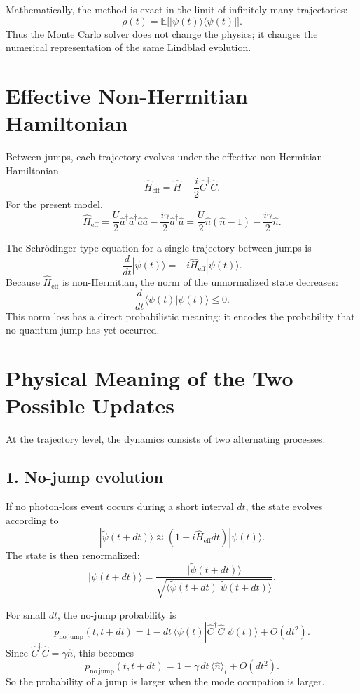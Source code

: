 \documentclass[12pt]{article}
\begin{document}
Mathematically, the method is exact in the limit of infinitely many trajectories:
\[
\rho(t) = \mathbb{E}\bigl[|\psi(t)\rangle\langle\psi(t)|\bigr].
\]
Thus the Monte Carlo solver does not change the physics; it changes the numerical representation of the same Lindblad evolution.

\section*{Effective Non-Hermitian Hamiltonian}
Between jumps, each trajectory evolves under the effective non-Hermitian Hamiltonian
\[
\hat H_{\mathrm{eff}}
= \hat H - \frac{i}{2}\hat C^\dagger \hat C.
\]
For the present model,
\[
\hat H_{\mathrm{eff}}
= \frac{U}{2}\hat a^\dagger \hat a^\dagger \hat a \hat a
- \frac{i\gamma}{2}\hat a^\dagger \hat a
= \frac{U}{2}\hat n(\hat n-1) - \frac{i\gamma}{2}\hat n.
\]

The Schr\"odinger-type equation for a single trajectory between jumps is
\[
\frac{d}{dt}|\psi(t)\rangle
= -i\hat H_{\mathrm{eff}}|\psi(t)\rangle.
\]
Because $\hat H_{\mathrm{eff}}$ is non-Hermitian, the norm of the unnormalized state decreases:
\[
\frac{d}{dt}\langle \psi(t)|\psi(t)\rangle \le 0.
\]
This norm loss has a direct probabilistic meaning: it encodes the probability that no quantum jump has yet occurred.

\section*{Physical Meaning of the Two Possible Updates}
At the trajectory level, the dynamics consists of two alternating processes.

\subsection*{1. No-jump evolution}
If no photon-loss event occurs during a short interval $dt$, the state evolves according to
\[
|\tilde\psi(t+dt)\rangle
\approx \left(1 - i\hat H_{\mathrm{eff}}dt\right)|\psi(t)\rangle.
\]
The state is then renormalized:
\[
|\psi(t+dt)\rangle
= \frac{|\tilde\psi(t+dt)\rangle}{\sqrt{\langle \tilde\psi(t+dt)|\tilde\psi(t+dt)\rangle}}.
\]

For small $dt$, the no-jump probability is
\[
p_{\mathrm{no\ jump}}(t,t+dt)
= 1 - dt\,\langle \psi(t)|\hat C^\dagger \hat C|\psi(t)\rangle + O(dt^2).
\]
Since $\hat C^\dagger \hat C=\gamma \hat n$, this becomes
\[
p_{\mathrm{no\ jump}}(t,t+dt)
= 1 - \gamma\,dt\,\langle \hat n\rangle_t + O(dt^2).
\]
So the probability of a jump is larger when the mode occupation is larger.
\end{document}
